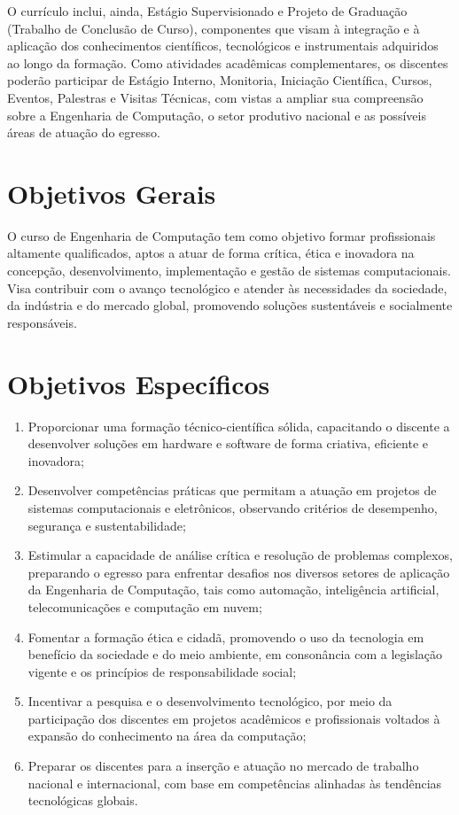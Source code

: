 O currículo inclui, ainda, Estágio Supervisionado e Projeto de Graduação (Trabalho de Conclusão de Curso), componentes que visam à integração e à aplicação dos conhecimentos científicos, tecnológicos e instrumentais adquiridos ao longo da formação. Como atividades acadêmicas complementares, os discentes poderão participar de Estágio Interno, Monitoria, Iniciação Científica, Cursos, Eventos, Palestras e Visitas Técnicas, com vistas a ampliar sua compreensão sobre a Engenharia de Computação, o setor produtivo nacional e as possíveis áreas de atuação do egresso.

\section{Objetivos Gerais}

O curso de Engenharia de Computação tem como objetivo formar profissionais altamente qualificados, aptos a atuar de forma crítica, ética e inovadora na concepção, desenvolvimento, implementação e gestão de sistemas computacionais. Visa contribuir com o avanço tecnológico e atender às necessidades da sociedade, da indústria e do mercado global, promovendo soluções sustentáveis e socialmente responsáveis.

\section{Objetivos Específicos}

\begin{enumerate}
    \item Proporcionar uma formação técnico-científica sólida, capacitando o discente a desenvolver soluções em hardware e software de forma criativa, eficiente e inovadora;

    \item Desenvolver competências práticas que permitam a atuação em projetos de sistemas computacionais e eletrônicos, observando critérios de desempenho, segurança e sustentabilidade;

    \item Estimular a capacidade de análise crítica e resolução de problemas complexos, preparando o egresso para enfrentar desafios nos diversos setores de aplicação da Engenharia de Computação, tais como automação, inteligência artificial, telecomunicações e computação em nuvem;

    \item Fomentar a formação ética e cidadã, promovendo o uso da tecnologia em benefício da sociedade e do meio ambiente, em consonância com a legislação vigente e os princípios de responsabilidade social;

    \item Incentivar a pesquisa e o desenvolvimento tecnológico, por meio da participação dos discentes em projetos acadêmicos e profissionais voltados à expansão do conhecimento na área da computação;

    \item Preparar os discentes para a inserção e atuação no mercado de trabalho nacional e internacional, com base em competências alinhadas às tendências tecnológicas globais.
\end{enumerate}

